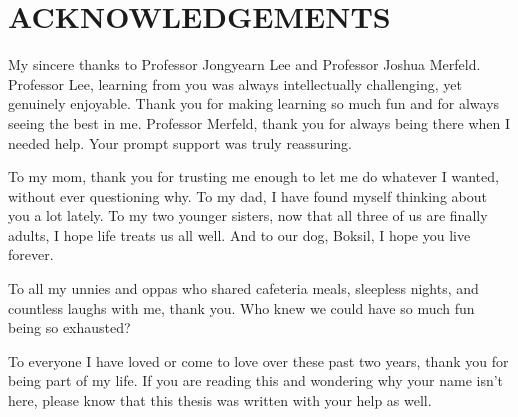 \chapter*{ACKNOWLEDGEMENTS}

My sincere thanks to Professor Jongyearn Lee and Professor Joshua Merfeld. Professor Lee, learning from you was always intellectually challenging, yet genuinely enjoyable. Thank you for making learning so much fun and for always seeing the best in me. Professor Merfeld, thank you for always being there when I needed help. Your prompt support was truly reassuring.

To my mom, thank you for trusting me enough to let me do whatever I wanted, without ever questioning why. To my dad, I have found myself thinking about you a lot lately. To my two younger sisters, now that all three of us are finally adults, I hope life treats us all well. And to our dog, Boksil, I hope you live forever.

To all my unnies and oppas who shared cafeteria meals, sleepless nights, and countless laughs with me, thank you. Who knew we could have so much fun being so exhausted?

To everyone I have loved or come to love over these past two years, thank you for being part of my life. If you are reading this and wondering why your name isn't here, please know that this thesis was written with your help as well.
